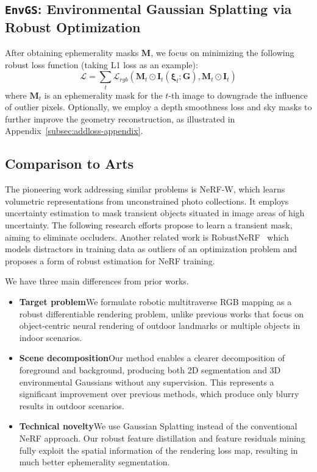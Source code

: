 \subsection{\texttt{EnvGS}: Environmental Gaussian Splatting via Robust Optimization}
\label{subsec:stage3}
After obtaining ephemerality masks $\mathbf{M}$, we focus on minimizing the following robust loss function (taking L1 loss as an example):
\begin{equation}
\mathcal{L} = \sum_t \mathcal{L}_{rgb} (  \mathbf{M}_t \odot \mathbf{I}_t(\boldsymbol{\xi}_t;\mathbf{G}) , \mathbf{M}_t \odot \mathbf{I}_t )
\end{equation}
where $\mathbf{M}_t$ is an ephemerality mask for the $t$-th image to downgrade the influence of outlier pixels. Optionally, we employ a depth smoothness loss and sky masks to further improve the geometry reconstruction, as illustrated in Appendix~\ref{subsec:addloss-appendix}.


\subsection{Comparison to Arts}
The pioneering work addressing similar problems is NeRF-W\cite{martin2021nerf}, which learns volumetric representations from unconstrained photo collections. It employs uncertainty estimation to mask transient objects situated in image areas of high uncertainty. The following research efforts propose to learn a transient mask, aiming to eliminate occluders\cite{chen2022hallucinated,yang2023cross}. Another related work is RobustNeRF~\cite{sabour2023robustnerf} which models distractors in training data as outliers of an optimization problem and proposes a form of robust estimation for NeRF training. 

We have three main differences from prior works.
\begin{itemize}[leftmargin=1.3em]
    \item \textbf{{Target problem}}\quad We formulate robotic multitraverse RGB mapping as a robust differentiable rendering problem, unlike previous works that focus on object-centric neural rendering of outdoor landmarks or multiple objects in indoor scenarios. 
    \item \textbf{{Scene decomposition}}\quad Our method enables a clearer decomposition of foreground and background, producing both 2D segmentation and 3D environmental Gaussians without any supervision. This represents a significant improvement over previous methods, which produce only blurry results in outdoor scenarios.
    \item \textbf{{Technical novelty}}\quad We use Gaussian Splatting instead of the conventional NeRF approach. Our robust feature distillation and feature residuals mining fully exploit the spatial information of the rendering loss map, resulting in much better ephemerality segmentation.
\end{itemize}





